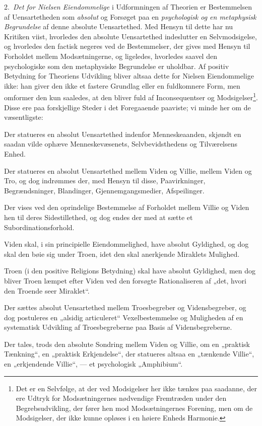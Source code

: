 \documentclass[12pt,a4paper]{book}
\newcommand{\opage}[1]{\marginnote{\footnotesize\textit{[#1]}}}
\begin{document}
2.~\emph{Det for Nielsen Eiendommelige} i Udformningen af Theorien er Bestemmelsen af
Uensartetheden som \emph{absolut} og Forsøget paa en \emph{psychologisk og en metaphysisk
Begrundelse} af denne absolute Uensartethed. Med Hensyn til dette har nu Kritiken viist,
hvorledes den absolute Uensartethed indeslutter en Selvmodsigelse, og hvorledes den factisk
negeres ved de Bestemmelser, der gives med Hensyn til Forholdet mellem Modsætningerne, og
lige\opage{213}ledes, hvorledes saavel den psychologiske som den metaphysiske Begrundelse er uholdbar. Af
positiv Betydning for Theoriens Udvikling bliver altsaa dette for Nielsen Eiendommelige ikke:
han giver den ikke et fastere Grundlag eller en fuldkomnere Form, men omformer den kun saaledes,
at den bliver fuld af Inconsequentser og Modsigelser\footnote{Det er en Selvfølge, at der ved
Modsigelser her ikke tænkes paa saadanne, der ere Udtryk for Modsætningernes nødvendige
Fremtræden under den Begrebsudvikling, der fører hen mod Modsætningernes Forening, men om de
Modsigelser, der ikke kunne opløses i en høiere Enheds Harmonie.}. Disse ere paa forskjellige
Steder i det Foregaaende paaviste; vi minde her om de væsentligste:

Der statueres en absolut Uensartethed indenfor Menneskeaanden, skjøndt en saadan vilde ophæve
Menneskevæsenets, Selvbevidsthedens og Tilværelsens Enhed.

Der statueres en absolut Uensartethed mellem Viden og Villie, mellem Viden og Tro, og dog
indrømmes der, med Hensyn til disse, Paavirkninger, Begrændsninger, Blandinger,
Gjennemgangsmedier, Afspeilinger.

Der vises ved den oprindelige Bestemmelse af Forholdet mellem Villie og Viden hen til deres
Sidestillethed, og dog endes der med at sætte et Subordinationsforhold.

Viden skal, i sin principielle Eiendommelighed, have absolut Gyldighed, og dog skal den bøie sig
under Troen, idet den skal anerkjende Miraklets Mulighed.

Troen (i den positive Religions Betydning) skal have absolut Gyldighed, men dog bliver Troen
læmpet efter Viden ved den forsøgte Rationaliseren af „det, hvori den Troende seer Miraklet“.

Der sættes absolut Uensartethed mellem Troesbegreber og Vidensbegreber, og dog postuleres en
„alsidig articuleret“ Vexelbestemmelse og Muligheden af en systematisk Udvikling af
Troesbegreberne paa Basis af Vidensbegreberne.

Der tales, trods den absolute Sondring mellem Viden og Villie, om en „praktisk Tænkning“, en
„praktisk Erkjen\opage{214}delse“, der statueres altsaa en „tænkende Villie“, en „erkjendende Villie“, ---
et psychologisk „Amphibium“.
\end{document}
